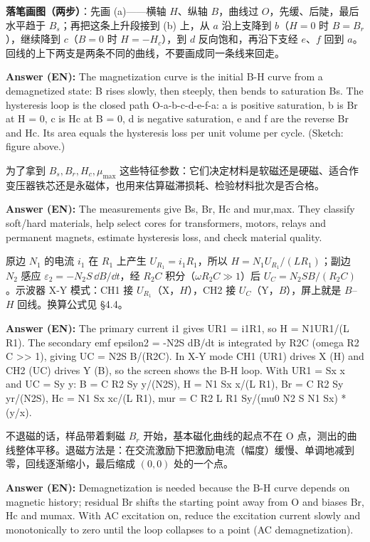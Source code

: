 \documentclass[11pt]{ctexart}
\begin{document}
\textbf{落笔画图（两步）}：先画 (a)——横轴 \(H\)、纵轴 \(B\)，曲线过 \(O\)，先缓、后陡，最后水平趋于 \(B_s\)；再把这条上升段接到 (b) 上，从 \(a\) 沿上支降到 \(b\)（\(H=0\) 时 \(B=B_r\)），继续降到 \(c\)（\(B=0\) 时 \(H=-H_c\)），到 \(d\) 反向饱和，再沿下支经 \(e\)、\(f\) 回到 \(a\)。回线的上下两支是两条不同的曲线，不要画成同一条线来回走。

\textbf{Answer (EN):} The magnetization curve is the initial B-H curve from a demagnetized state: B rises slowly, then steeply, then bends to saturation Bs. The hysteresis loop is the closed path O-a-b-c-d-e-f-a: a is positive saturation, b is Br at H = 0, c is Hc at B = 0, d is negative saturation, e and f are the reverse Br and Hc. Its area equals the hysteresis loss per unit volume per cycle. (Sketch: figure above.)

为了拿到 \(B_s,B_r,H_c,\mu_{\max}\) 这些特征参数：它们决定材料是软磁还是硬磁、适合作变压器铁芯还是永磁体，也用来估算磁滞损耗、检验材料批次是否合格。

\textbf{Answer (EN):} The measurements give Bs, Br, Hc and mur,max. They classify soft/hard materials, help select cores for transformers, motors, relays and permanent magnets, estimate hysteresis loss, and check material quality.

原边 \(N_1\) 的电流 \(i_1\) 在 \(R_1\) 上产生 \(U_{R_1}=i_1R_1\)，所以 \(H=N_1U_{R_1}/(LR_1)\)；副边 \(N_2\) 感应 \(\varepsilon_2=-N_2S\,\dd B/\dd t\)，经 \(R_2C\) 积分（\(\omega R_2C\gg1\)）后 \(U_C=N_2SB/(R_2C)\)。示波器 X-Y 模式：CH1 接 \(U_{R_1}\)（X，\(H\)），CH2 接 \(U_C\)（Y，\(B\)），屏上就是 \(B\)--\(H\) 回线。换算公式见 §4.4。

\textbf{Answer (EN):} The primary current i1 gives UR1 = i1R1, so H = N1UR1/(L R1). The secondary emf epsilon2 = -N2S dB/dt is integrated by R2C (omega R2 C >> 1), giving UC = N2S B/(R2C). In X-Y mode CH1 (UR1) drives X (H) and CH2 (UC) drives Y (B), so the screen shows the B-H loop. With UR1 = Sx x and UC = Sy y: B = C R2 Sy y/(N2S), H = N1 Sx x/(L R1), Br = C R2 Sy yr/(N2S), Hc = N1 Sx xc/(L R1), mur = C R2 L R1 Sy/(mu0 N2 S N1 Sx) * (y/x).

不退磁的话，样品带着剩磁 \(B_r\) 开始，基本磁化曲线的起点不在 O 点，测出的曲线整体平移。退磁方法是：在交流激励下把激励电流（幅度）缓慢、单调地减到零，回线逐渐缩小，最后缩成 \((0,0)\) 处的一个点。

\textbf{Answer (EN):} Demagnetization is needed because the B-H curve depends on magnetic history; residual Br shifts the starting point away from O and biases Br, Hc and mumax. With AC excitation on, reduce the excitation current slowly and monotonically to zero until the loop collapses to a point (AC demagnetization).
\end{document}
